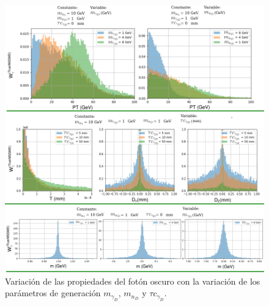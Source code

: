 \begin{figure}[!ht]
\centering
\includegraphics[width=.9\textwidth]{Simulacion/imagenes/True_PT5.png}
\caption{Variación de las propiedades del fotón oscuro con la variación de los parámetros de generación $m_{\gamma_D}$, $m_{n_D}$ y $\tau c_{\gamma_D}$.}
\label{PT_mu_True2}
\end{figure}









